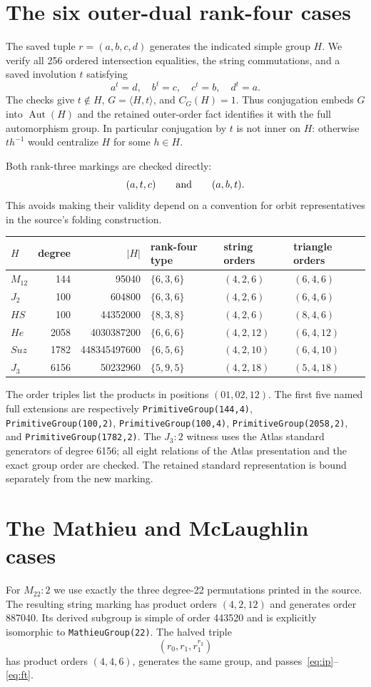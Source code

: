 \documentclass[11pt]{article}
\begin{document}
\section{The six outer-dual rank-four cases}
The saved tuple $r=(a,b,c,d)$ generates the indicated simple group $H$. We verify all 256 ordered intersection equalities, the string commutations, and a saved involution $t$ satisfying
\[
 a^t=d,\quad b^t=c,\quad c^t=b,\quad d^t=a.
\]
The checks give $t\notin H$, $G=\langle H,t\rangle$, and $C_G(H)=1$. Thus conjugation embeds $G$ into $\operatorname{Aut}(H)$ and the retained outer-order fact identifies it with the full automorphism group. In particular conjugation by $t$ is not inner on $H$: otherwise $th^{-1}$ would centralize $H$ for some $h\in H$.

Both rank-three markings are checked directly:
\[
 (a,t,c)\qquad\hbox{and}\qquad(a,b,t).
\]
This avoids making their validity depend on a convention for orbit representatives in the source's folding construction.
\begin{center}
\begin{tabular}{lrrlll}\toprule
$H$&degree&$|H|$&rank-four type&string orders&triangle orders\\\midrule
$M_{12}$&144&95040&$\{6,3,6\}$&$(4,2,6)$&$(6,4,6)$\\
$J_2$&100&604800&$\{6,3,6\}$&$(4,2,6)$&$(6,4,6)$\\
$HS$&100&44352000&$\{8,3,8\}$&$(4,2,6)$&$(8,4,6)$\\
$He$&2058&4030387200&$\{6,6,6\}$&$(4,2,12)$&$(6,4,12)$\\
$Suz$&1782&448345497600&$\{6,5,6\}$&$(4,2,10)$&$(6,4,10)$\\
$J_3$&6156&50232960&$\{5,9,5\}$&$(4,2,18)$&$(5,4,18)$\\\bottomrule
\end{tabular}
\end{center}
The order triples list the products in positions $(01,02,12)$. The first five named full extensions are respectively \texttt{PrimitiveGroup(144,4)}, \texttt{PrimitiveGroup(100,2)}, \texttt{PrimitiveGroup(100,4)}, \texttt{PrimitiveGroup(2058,2)}, and \texttt{PrimitiveGroup(1782,2)}. The $J_3:2$ witness uses the Atlas standard generators of degree 6156; all eight relations of the Atlas presentation and the exact group order are checked. The retained standard representation is bound separately from the new marking.
\section{The Mathieu and McLaughlin cases}
For $M_{22}:2$ we use exactly the three degree-22 permutations printed in the source. The resulting string marking has product orders $(4,2,12)$ and generates order 887040. Its derived subgroup is simple of order 443520 and is explicitly isomorphic to \texttt{MathieuGroup(22)}. The halved triple
\[
 (r_0,r_1,r_1^{r_2})
\]
has product orders $(4,4,6)$, generates the same group, and passes~\eqref{eq:ip}--\eqref{eq:ft}.
\end{document}
